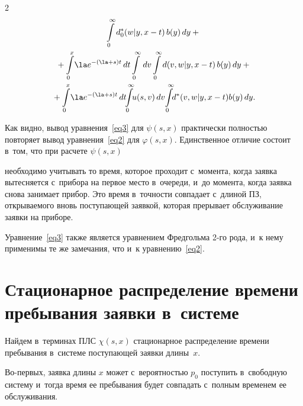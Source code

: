 \begin{multicols}{2}
\begin{multline*}
\int\limits_0^\infty d^*_0(w|y,x-t)\, b(y)\, dy


+{}\\


{}+


\int\limits_0^x \!\la e^{-(\la+s) t}\,dt


\int\limits_0^\infty \, dv


\int\limits_0^\infty d(v,w|y,x-t)\, b(y)\, dy


+{}\\


{}+


\int\limits_0^x\! \la e^{-(\la+s) t}\,dt\!\!


\int\limits_0^\infty\! \!u(s,v)\, dv\!


\int\limits_0^\infty\!\! d^*(v,w|y,x-t) b(y)\, dy.


\end{multline*}





Как видно, вывод уравнения~\eqref{eq3} для $\psi(s,x)$ практически полностью повторяет вывод уравнения~\eqref{eq2} для $\varphi(s,x)$. Единственное отличие состоит в~том, что при расчете $\psi(s,x)$


необходимо учитывать то время, которое проходит с~момента, когда заявка вытесняется с~прибора на первое место в~очереди, и~до момента, когда заявка снова занимает прибор. Это время в~точности совпадает с~длиной ПЗ, открываемого вновь поступающей заявкой, которая прерывает обслуживание заявки на приборе.


Уравнение~\eqref{eq3} также является уравнением Фредгольма 2-го рода, и~к нему применимы те же замечания, что и~к уравнению~\eqref{eq2}.





\section{Стационарное распределение времени пребывания заявки в~системе}








Найдем в~терминах ПЛС $\chi(s,x)$ стационарное распределение времени пребывания в~системе поступающей заявки длины~$x$.





Во-первых, заявка длины $x$ может с~вероят\-ностью $p_0$ поступить в~свободную систему и~тогда время ее пребывания будет совпадать с~полным временем ее обслуживания.






\end{multicols}
